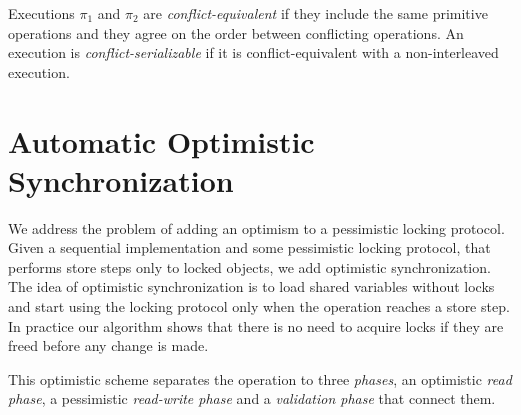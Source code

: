 \documentclass{article}
\begin{document}


Executions $\pi_1$ and $\pi_2$ are \emph{conflict-equivalent} 
if they include the same primitive operations and they 
agree on the order between conflicting operations. 
An execution is \emph{conflict-serializable} if it is 
conflict-equivalent with a non-interleaved execution.





\section{Automatic Optimistic Synchronization}
We address the problem of adding an 
optimism to a pessimistic locking protocol. 
Given a sequential implementation and some pessimistic
locking protocol, that performs store steps 
only to locked objects,
we add optimistic synchronization. 
The idea of optimistic synchronization is to load 
shared variables without locks and start using the 
locking protocol only when the operation reaches a store step.
In practice our algorithm shows that there is no need to 
acquire locks if they are freed before any change is made.    

This optimistic scheme separates the operation to three
\emph{phases}, an optimistic \emph{read phase},
a pessimistic \emph{read-write phase} and a 
\emph{validation phase} that connect them. 
\end{document}
